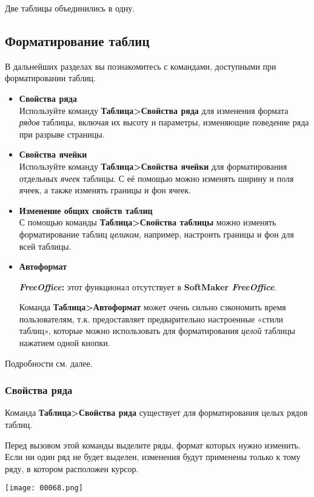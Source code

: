 \documentclass[a4paper,10pt]{article}
\begin{document}
Две таблицы объединились в одну.

\subsection{Форматирование таблиц}
В дальнейших разделах вы познакомитесь с командами, доступными при форматировании таблиц.
\begin{itemize}
 \item \textbf{Свойства ряда}\\
 Используйте команду \textbf{Таблица>Свойства ряда} для изменения формата \textit{рядов} таблицы, включая их высоту и параметры, изменяющие поведение ряда при разрыве страницы.
 \item \textbf{Свойства ячейки}\\
 Используйте команду \textbf{Таблица>Свойства ячейки} для форматирования отдельных \textit{ячеек} таблицы. С её помощью можно изменять ширину и поля ячеек, а также изменять границы и фон ячеек.
 \item \textbf{Изменение общих свойств таблиц}\\
 С помощью команды \textbf{Таблица>Свойства таблицы} можно изменять форматирование таблиц \textit{целиком}, например, настроить границы и фон для всей таблицы.
 \item \textbf{Автоформат}\\
 \begin{mdframed}[backgroundcolor=pink!50]
\textbf{\textit{FreeOffice}:} этот функционал отсутствует в \textbf{SoftMaker \textit{FreeOffice}}.
\end{mdframed}
Команда \textbf{Таблица>Автоформат} может очень сильно сэкономить время пользователям, т.к. предоставляет предварительно настроенные  «стили таблиц», которые можно использовать для форматирования \textit{целой} таблицы нажатием одной кнопки.
\end{itemize}

Подробности см. далее.

\subsubsection{Свойства ряда}
Команда \textbf{Таблица>Свойства ряда} существует для форматирования целых рядов таблиц.

Перед вызовом этой команды выделите ряды, формат которых нужно изменить. Если ни один ряд не будет выделен, изменения будут применены только к тому ряду, в котором расположен курсор.

\texttt{[image: 00068.png]}
\end{document}
